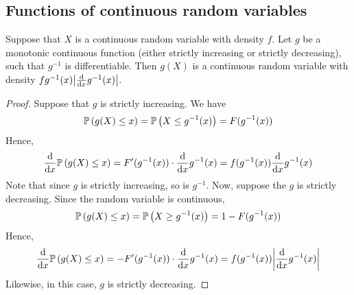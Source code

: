 \subsection{Functions of continuous random variables}
\begin{theorem}
	Suppose that \(X\) is a continuous random variable with density \(f\).
	Let \(g\) be a monotonic continuous function (either strictly increasing or strictly decreasing), such that \(g^{-1}\) is differentiable.
	Then \(g(X)\) is a continuous random variable with density \(fg^{-1}(x) \abs{\dv{x} g^{-1}(x)}\).
\end{theorem}
\begin{proof}
	Suppose that \(g\) is strictly increasing.
	We have
	\[
		\mathbb{P}\left({g(X) \leq x}\right) = \mathbb{P}\left({X \leq g^{-1}(x)}\right) = F(g^{-1}(x))
	\]
	Hence,
	\[
		\dv{x} \mathbb{P}\left({g(X) \leq x}\right) = F'(g^{-1}(x)) \cdot \dv{x} g^{-1}(x) = f(g^{-1}(x)) \dv{x}g^{-1}(x)
	\]
	Note that since \(g\) is strictly increasing, so is \(g^{-1}\).
	Now, suppose the \(g\) is strictly decreasing.
	Since the random variable is continuous,
	\[
		\mathbb{P}\left({g(X) \leq x}\right) = \mathbb{P}\left({X \geq g^{-1}(x)}\right) = 1 - F(g^{-1}(x))
	\]
	Hence,
	\[
		\dv{x} \mathbb{P}\left({g(X) \leq x}\right) = -F'(g^{-1}(x)) \cdot \dv{x} g^{-1}(x) = f(g^{-1}(x)) \abs{\dv{x}g^{-1}(x)}
	\]
	Likewise, in this case, \(g\) is strictly decreasing.
\end{proof}


